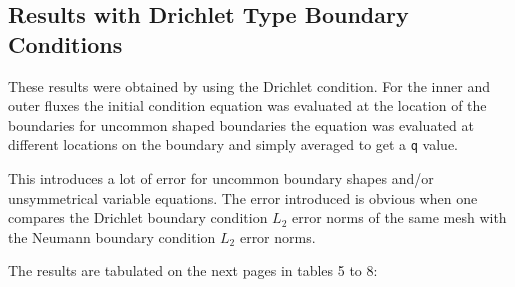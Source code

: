 \documentclass[a4paper, 12pt]{article}
\begin{document}
\subsection{Results with Drichlet Type Boundary Conditions} \label{drichlet}
These results were obtained by using the Drichlet condition. For the inner and outer fluxes the initial condition equation was evaluated at the location of the boundaries for uncommon shaped boundaries the equation was evaluated at different locations on the boundary and simply averaged to get a \verb|q| value.\\\par
This introduces a lot of error for uncommon boundary shapes and/or unsymmetrical variable equations. The error introduced is obvious when one compares the Drichlet boundary condition $L_2$ error norms of the same mesh with the Neumann boundary condition $L_2$ error norms.\\\par
The results are tabulated on the next pages in tables 5 to 8: \\\par
\end{document}
